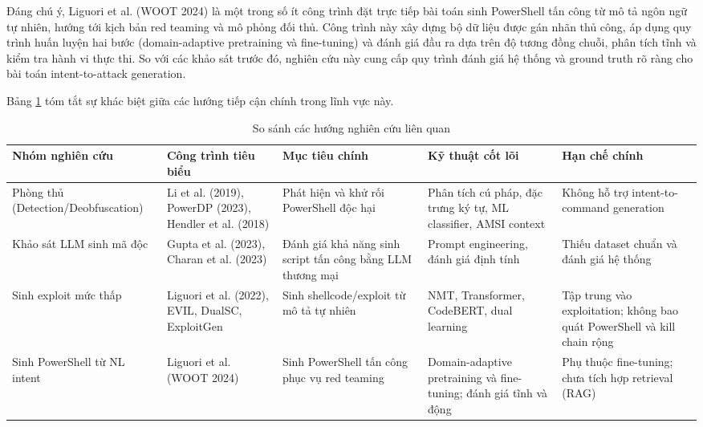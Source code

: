 Đáng chú ý, Liguori et al. (WOOT 2024) là một trong số ít công trình đặt trực tiếp bài toán sinh PowerShell tấn công từ mô tả ngôn ngữ tự nhiên, hướng tới kịch bản red teaming và mô phỏng đối thủ. Công trình này xây dựng bộ dữ liệu được gán nhãn thủ công, áp dụng quy trình huấn luyện hai bước (domain-adaptive pretraining và fine-tuning) và đánh giá đầu ra dựa trên độ tương đồng chuỗi, phân tích tĩnh và kiểm tra hành vi thực thi. So với các khảo sát trước đó, nghiên cứu này cung cấp quy trình đánh giá hệ thống và ground truth rõ ràng cho bài toán intent-to-attack generation.

Bảng \ref{tab:related_work} tóm tắt sự khác biệt giữa các hướng tiếp cận chính trong lĩnh vực này.

\begin{table}
\centering
\small
\caption{So sánh các hướng nghiên cứu liên quan}
\label{tab:related_work}

\begin{tabularx}{\textwidth}{
l
l
>{\raggedright\arraybackslash}X
>{\raggedright\arraybackslash}X
>{\raggedright\arraybackslash}X
}
\toprule
\textbf{Nhóm nghiên cứu} &
\textbf{Công trình tiêu biểu} &
\textbf{Mục tiêu chính} &
\textbf{Kỹ thuật cốt lõi} &
\textbf{Hạn chế chính} \\
\midrule

Phòng thủ (Detection/Deobfuscation)
& Li et al. (2019), PowerDP (2023), Hendler et al. (2018)
& Phát hiện và khử rối PowerShell độc hại
& Phân tích cú pháp, đặc trưng ký tự, ML classifier, AMSI context
& Không hỗ trợ intent-to-command generation \\

Khảo sát LLM sinh mã độc
& Gupta et al. (2023), Charan et al. (2023)
& Đánh giá khả năng sinh script tấn công bằng LLM thương mại
& Prompt engineering, đánh giá định tính
& Thiếu dataset chuẩn và đánh giá hệ thống \\

Sinh exploit mức thấp
& Liguori et al. (2022), EVIL, DualSC, ExploitGen
& Sinh shellcode/exploit từ mô tả tự nhiên
& NMT, Transformer, CodeBERT, dual learning
& Tập trung vào exploitation; không bao quát PowerShell và kill chain rộng \\

Sinh PowerShell từ NL intent
& Liguori et al. (WOOT 2024)
& Sinh PowerShell tấn công phục vụ red teaming
& Domain-adaptive pretraining và fine-tuning; đánh giá tĩnh và động
& Phụ thuộc fine-tuning; chưa tích hợp retrieval (RAG) \\

\bottomrule
\end{tabularx}

\end{table}






